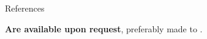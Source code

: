 \begin{rSection}{References}

\textbf{Are available upon request}, preferably made to \workemail.

\end{rSection}